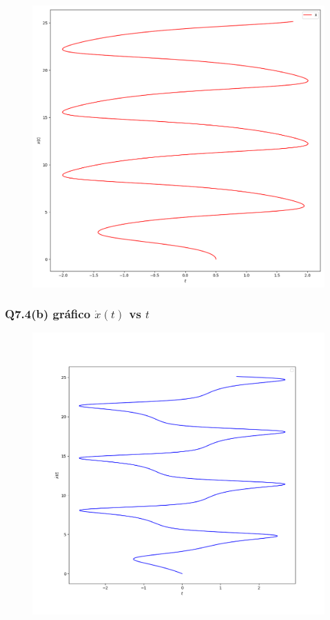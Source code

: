 \documentclass[12pt]{article}
\begin{document}
\begin{figure}[!hbt]
  \begin{center}
    \includegraphics[scale=0.6]{./Cod_74/x(t)_t}
  \end{center}
\end{figure}

\clearpage
\subsubsection*{Q7.4(b) gráfico $\dot x(t)$ vs $t$}

\begin{figure}[!hbt]
  \begin{center}
    \includegraphics[scale=0.7]{./Cod_74/xdot_t}
  \end{center}
\end{figure}
\end{document}
